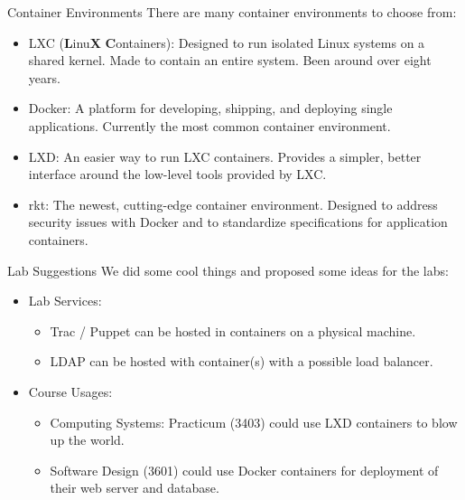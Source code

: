 \documentclass[xcolor=dvipsnames,aspectratio=1610]{beamer}
\begin{document}
  \begin{frame}{Container Environments}
    There are many container environments to choose from:

    \begin{itemize}
        \item \alert{LXC} (\textbf{L}inu\textbf{X} \textbf{C}ontainers): Designed to run isolated Linux systems on a shared kernel. Made to contain an entire system. Been around over eight years.
        \item \alert{Docker}: A platform for developing, shipping, and deploying single applications. Currently the most common container environment.
        \item \alert{LXD}: An easier way to run LXC containers. Provides a simpler, better interface around the low-level tools provided by LXC.
        \item \alert{rkt}: The newest, cutting-edge container environment. Designed to address security issues with Docker and to standardize specifications for application containers.
    \end{itemize}
  \end{frame}

  \begin{frame}{Lab Suggestions}
    We did some cool things and proposed some ideas for the labs:

    \begin{itemize}
        \item \alert{Lab Services}:
        \begin{itemize}
            \item Trac / Puppet can be hosted in containers on a physical machine.
            \item LDAP can be hosted with container(s) with a possible load balancer.
        \end{itemize}

        \item \alert{Course Usages}:
        \begin{itemize}
            \item Computing Systems: Practicum (3403) could use LXD containers to blow up the world.
            \item Software Design (3601) could use Docker containers for deployment of their web server and database.
        \end{itemize}
    \end{itemize}
  \end{frame}
\end{document}
